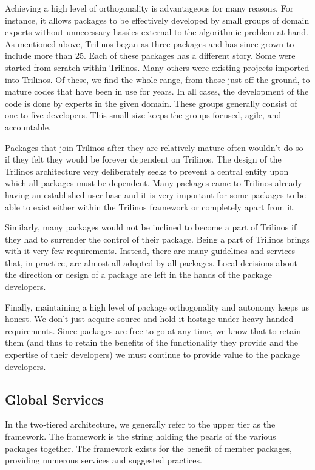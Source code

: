 \documentclass[12pt,relax]{article}
\begin{document}
Achieving a high level of orthogonality is advantageous for many reasons.  For 
instance, it allows packages to be effectively developed by small groups of 
domain experts without unnecessary hassles external to the algorithmic problem 
at hand.  As mentioned above, Trilinos began as three packages and has since
grown to include more than 25.  Each of these packages has a different story.  
Some were started from scratch within Trilinos.  Many others were existing
projects imported into Trilinos.  Of these, we find the whole range, from
those just off the ground, to mature codes that have been in use for years.
In all cases, the development of the code is done by experts in the given
domain.  These groups generally consist of one to five developers.  This
small size keeps the groups focused, agile, and accountable.
  
Packages that join Trilinos after they are relatively mature often wouldn't
do so if they felt they would be forever dependent on Trilinos.  The design
of the Trilinos architecture very deliberately seeks to prevent a central
entity upon which all packages must be dependent.  Many packages came to 
Trilinos already having an established user base and it is very important
for some packages to be able to exist either within the Trilinos framework
or completely apart from it.

Similarly, many packages would not be inclined to become a part of Trilinos
if they had to surrender the control of their package.  Being a part of
Trilinos brings with it very few requirements.  Instead, there are many
guidelines and services that, in practice, are almost all adopted by all
packages.  Local decisions about the direction or design of a package are
left in the hands of the package developers.

Finally, maintaining a high level of package orthogonality and autonomy
keeps us honest.  We don't just acquire source and hold it hostage under heavy
handed requirements.  Since packages are free to go at any time, we know that
to retain them (and thus to retain the benefits of the functionality they
provide and the expertise of their developers) we must continue to provide
value to the package developers.

\subsection{Global Services}
\label{subsect:GlobalServices}

In the two-tiered architecture, we generally refer to the upper tier as the
framework.  The framework is the string holding the pearls of the various
packages together.  The framework exists for the benefit of member
packages, providing numerous services and suggested practices.
\end{document}
